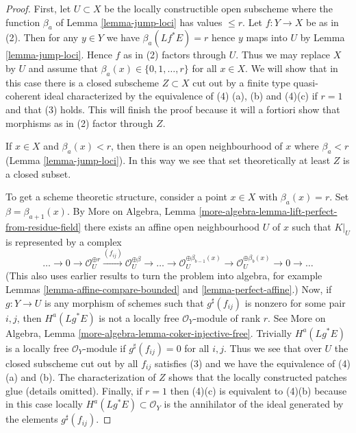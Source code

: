 \documentclass{stacks-project}
\theoremstyle{plain}
\theoremstyle{definition}
\theoremstyle{remark}
\numberwithin{equation}{subsection}
\begin{document}
\begin{proof}
First, let $U \subset X$ be the locally constructible
open subscheme where the function
$\beta_a$ of Lemma \ref{lemma-jump-loci} has values $\leq r$.
Let $f : Y \to X$ be as in (2). Then for any $y \in Y$
we have $\beta_a(Lf^*E) = r$ hence $y$ maps into $U$ by
Lemma \ref{lemma-jump-loci}. Hence $f$ as in (2) factors through $U$.
Thus we may replace $X$ by $U$ and assume that
$\beta_a(x) \in \{0, 1, \ldots, r\}$ for all $x \in X$.
We will show that in this case
there is a closed subscheme $Z \subset X$ cut out by a finite type
quasi-coherent ideal characterized
by the equivalence of (4) (a), (b) and (4)(c) if $r = 1$
and that (3) holds.
This will finish the proof because it will a fortiori show
that morphisms as in (2) factor through $Z$.

\medskip\noindent
If $x \in X$ and $\beta_a(x) < r$, then there is an
open neighbourhood of $x$ where $\beta_a < r$
(Lemma \ref{lemma-jump-loci}). In this way we
see that set theoretically at least $Z$ is a closed subset.

\medskip\noindent
To get a scheme theoretic structure, consider a point $x \in X$
with $\beta_a(x) = r$. Set $\beta = \beta_{a + 1}(x)$.
By More on Algebra, Lemma
\ref{more-algebra-lemma-lift-perfect-from-residue-field}
there exists an affine open neighbourhood $U$ of $x$
such that $K|_U$ is represented by a complex
$$
\ldots \to 0 \to \mathcal{O}_U^{\oplus r}
\xrightarrow{(f_{ij})} \mathcal{O}_U^{\oplus \beta} \to
\ldots \to
\mathcal{O}_U^{\oplus \beta_{b - 1}(x)} \to
\mathcal{O}_U^{\oplus \beta_b(x)} \to 0
\to \ldots
$$
(This also uses earlier results to turn the problem into algebra, for example
Lemmas \ref{lemma-affine-compare-bounded} and
\ref{lemma-perfect-affine}.) Now, if $g : Y \to U$ is any morphism
of schemes such that $g^\sharp(f_{ij})$ is nonzero for some pair $i, j$, then
$H^a(Lg^*E)$ is not a locally free $\mathcal{O}_Y$-module of rank $r$.
See More on Algebra, Lemma \ref{more-algebra-lemma-coker-injective-free}.
Trivially $H^a(Lg^*E)$ is a locally free $\mathcal{O}_Y$-module if
$g^\sharp(f_{ij}) = 0$ for all $i, j$. Thus we see that over $U$ the
closed subscheme cut out by all $f_{ij}$ satisfies
(3) and we have the equivalence of (4)(a) and (b).
The characterization of $Z$ shows that the locally constructed patches
glue (details omitted). Finally, if $r = 1$ then
(4)(c) is equivalent to (4)(b) because in this case locally
$H^a(Lg^*E) \subset \mathcal{O}_Y$ is the annihilator of the ideal generated
by the elements $g^\sharp(f_{ij})$.
\end{proof}
\end{document}
